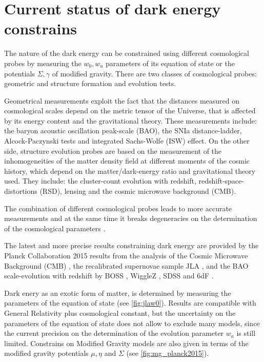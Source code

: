 \section{Current status of dark energy constrains}
The nature of the dark energy can be constrained using different cosmological probes \cite{Weinberg201387} by measuring the $w_0,w_a$ parameters of its equation of state or the potentials $\Sigma,\gamma$ of modified gravity. There are two classes of cosmological probes: geometric and structure formation and evolution tests.
\newline

Geometrical measurements exploit the fact that the distances measured on cosmological scales depend on the metric tensor of the Universe, that is affected by its energy content and the gravitational theory. These measurements include: the baryon acoustic oscillation peak-scale (BAO), the SNIa distance-ladder, Alcock-Paczynski \cite{1979Natur.281..358A} tests and integrated Sachs-Wolfe (ISW) effect. On the other side, structure evolution probes are based on the measurement of the inhomogeneities of the matter density field at different moments of the cosmic history, which depend on the matter/dark-energy ratio and gravitational theory used. They include: the cluster-count evolution with redshift, redshift-space-distortions (RSD), lensing and the cosmic microwave background (CMB).
\newline

The combination of different cosmological probes leads to more accurate measurements and at the same time it breaks degeneracies on the determination of the cosmological parameters \cite{2006A&A...448..831Y,Weinberg201387}.
\newline

The latest and more precise results constraining dark energy are provided by the Planck Collaboration 2015 results from the analysis of the Cosmic Microwave Background (CMB) \cite{2016A&A...594A..14P}, the recalibrated supernovae sample JLA \cite{2014A&A...568A..22B}, and the BAO scale-evolution with redshift by BOSS \cite{Ata:2017dya}, WiggleZ \cite{2014MNRAS.441.3524K}, SDSS \cite{2015MNRAS.449..835R} and 6dF \cite{2011MNRAS.416.3017B}.
\newline

Dark enery as an exotic form of matter, is determined by measuring the parameters of the equation of state (see \autoref{fig:jlaw0}). Results are compatible with General Relativity plus cosmological constant, but the uncertainty on the parameters of the equation of state does not allow to exclude many models, since the current precision on the determination of the evolution parameter $w_a$ is still limited. Constrains on Modified Gravity models are also given in terms of the modified gravity potentials $\mu,\eta$ and $\Sigma$ (see \autoref{fig:mg_planck2015}).
\newline


